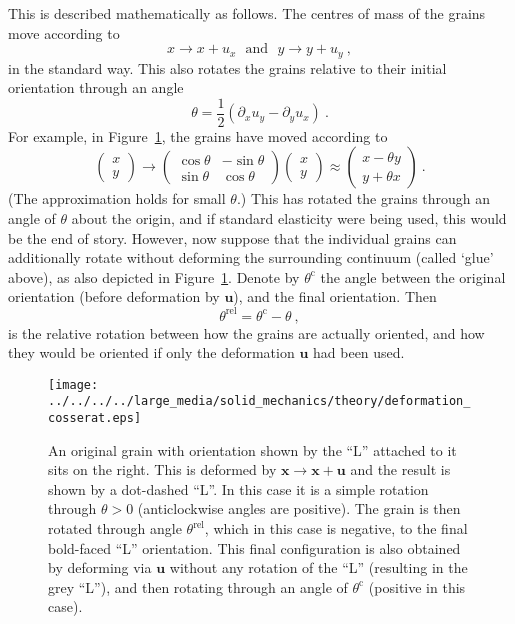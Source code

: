 \documentclass[]{scrreprt}
\newcommand{\mand}{\ \ \ \mbox{and}\ \ \ }
\newcommand{\pl}{\partial}
\newcommand{\ha}{\mbox{$\frac{1}{2}$}}
\newcommand{\thetac}{\theta^{\mathrm{c}}}
\newcommand{\thetarel}{\theta^{\mathrm{rel}}}
\begin{document}
This is described mathematically as follows.  The centres of mass of
the grains move according to
$$
x \rightarrow x + u_{x} \mand y\rightarrow y+ u_{y} \ ,
$$
in the standard way.  This also rotates the grains relative to their
initial orientation through an angle
$$
\theta = \ha(\pl_{x}u_{y}-\pl_{y}u_{x}) \ .
$$
For example, in Figure~\ref{deformation_cosserat.fig}, the grains have
moved according to
\begin{equation}
\left(\begin{array}{c}x\\y\end{array}\right) \rightarrow
\left(\begin{array}{cc}\cos\theta & -\sin\theta \\ \sin\theta & \cos\theta
\end{array}\right)
\left(\begin{array}{c}x\\y\end{array}\right)
\approx
\left(\begin{array}{c}x - \theta y\\y + \theta x\end{array}\right)   \ .
\label{rigid.rot.eqn}
\end{equation}
(The approximation holds for small $\theta$.)  This has rotated the
grains through an angle of $\theta$ about the origin, and if standard
elasticity were being used, this would be the end of story.  However,
now suppose that the individual grains can additionally rotate without
deforming the surrounding continuum (called `glue' above), as also
depicted in Figure~\ref{deformation_cosserat.fig}.  Denote by
$\thetac$ the angle between the original orientation (before
deformation by ${\mathbf u}$), and the final orientation.  Then
$$
\thetarel = \thetac - \theta \ ,
$$
is the relative rotation between how the grains are actually oriented,
and how they would be oriented if only the deformation ${\mathbf u}$
had been used.

\begin{figure}[htb]
\begin{center}
\texttt{[image: ../../../../large\_media/solid\_mechanics/theory/deformation\_cosserat.eps]}
\caption{An original grain with orientation shown by the ``L''
  attached to it sits on the right.  This is deformed by ${\mathbf
  x}\rightarrow {\mathbf x}+{\mathbf u}$ and the result is shown by a
  dot-dashed ``L''.  In this case it is a simple rotation through
  $\theta>0$ (anticlockwise angles are positive).  The grain is then
  rotated through angle $\thetarel$, which in this case is negative, to
  the final bold-faced ``L'' orientation.  This final configuration is
  also obtained by deforming via ${\mathbf u}$ without any rotation of
  the ``L'' (resulting in the grey ``L''), and then rotating through
  an angle of $\thetac$ (positive in this case).}
\label{deformation_cosserat.fig}
\end{center}
\end{figure}
\end{document}
